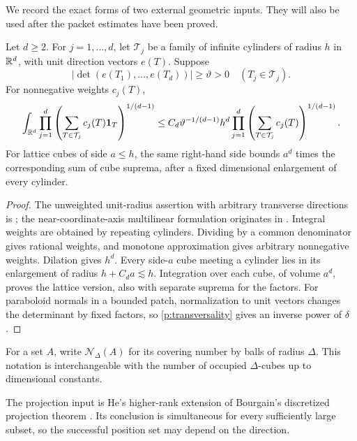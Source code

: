 We record the exact forms of two external geometric inputs.  They will also
be used after the packet estimates have been proved.

\begin{proposition}\label{p:kakeya}
Let $d\geq2$.  For $j=1,\ldots,d$, let $\mathcal T_j$ be a family of infinite
cylinders of radius $h$ in $\mathbb R^d$, with unit direction vectors $e(T)$.  Suppose
\[
 |\det(e(T_1),\ldots,e(T_d))|\geq\vartheta>0
 \quad(T_j\in\mathcal T_j).
\]
For nonnegative weights $c_j(T)$,
\begin{equation}\label{p:kakeya-equation}
 \int_{\mathbb R^d}\prod_{j=1}^d
 \left(\sum_{T\in\mathcal T_j}c_j(T)\mathbf1_T\right)^{1/(d-1)}
 \leq C_d\vartheta^{-1/(d-1)}h^d
 \prod_{j=1}^d\left(\sum_{T\in\mathcal T_j}c_j(T)\right)^{1/(d-1)}.
\end{equation}
For lattice cubes of side $a\le h$, the same right-hand side bounds
$a^d$ times the corresponding sum of cube suprema, after a fixed
dimensional enlargement of every cylinder.
\end{proposition}
\begin{proof}
The unweighted unit-radius assertion with arbitrary transverse directions is
\citet[Theorem~2]{Guth2010}; the near-coordinate-axis multilinear formulation
originates in \citet{BCT2006}.  Integral weights are obtained by repeating
cylinders.  Dividing by a common denominator gives rational weights, and
monotone approximation gives arbitrary nonnegative weights.  Dilation gives
$h^d$. Every side-$a$ cube meeting a cylinder lies in its enlargement
of radius $h+C_da\lesssim h$. Integration over each cube, of volume
$a^d$, proves the lattice version, also with separate suprema for the
factors. For paraboloid normals in a bounded patch,
normalization to unit vectors changes the determinant by fixed factors, so
\eqref{p:transversality} gives an inverse power of $\delta$.
\end{proof}

For a set $A$, write $\mathcal N_\Delta(A)$ for its covering number by balls of
radius $\Delta$.  This notation is interchangeable with the number of occupied
$\Delta$-cubes up to dimensional constants.

The projection input is He's higher-rank extension of Bourgain's
discretized projection theorem \citep{BourgainProjection2010,He2020}.
Its conclusion is simultaneous for every sufficiently large subset,
so the successful position set may depend on the direction.

